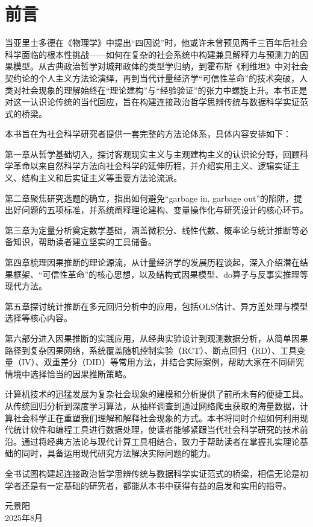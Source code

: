 \chapter*{前言}

当亚里士多德在《物理学》中提出``四因说''时，他或许未曾预见两千三百年后社会科学面临的根本性挑战——如何在复杂的社会系统中构建兼具解释力与预测力的因果模型。从古典政治哲学对城邦政体的类型学归纳，到霍布斯《利维坦》中对社会契约论的个人主义方法论演绎，再到当代计量经济学``可信性革命''的技术突破，人类对社会现象的理解始终在``理论建构''与``经验验证''的张力中螺旋上升。本书正是对这一认识论传统的当代回应，旨在构建连接政治哲学思辨传统与数据科学实证范式的桥梁。

本书旨在为社会科学研究者提供一套完整的方法论体系，具体内容安排如下：

\begin{itemize}
    {\fangsong \item 第一章从哲学基础切入，探讨客观现实主义与主观建构主义的认识论分野，回顾科学革命以来自然科学方法向社会科学的延伸历程，并介绍实用主义、逻辑实证主义、结构主义和后实证主义等重要方法论流派。
    
    \item 第二章聚焦研究选题的确立，指出如何避免``garbage in, garbage out''的陷阱，提出好问题的五项标准，并系统阐释理论建构、变量操作化与研究设计的核心环节。
    
    \item 第三章为定量分析奠定数学基础，涵盖微积分、线性代数、概率论与统计推断等必备知识，帮助读者建立坚实的工具储备。
    
    \item 第四章梳理因果推断的理论源流，从计量经济学的发展历程谈起，深入介绍潜在结果框架、``可信性革命''的核心思想，以及结构式因果模型、do算子与反事实推理等现代方法。
    
    \item 第五章探讨统计推断在多元回归分析中的应用，包括OLS估计、异方差处理与模型选择等核心内容。
    
    \item 第六部分进入因果推断的实践应用，从经典实验设计到观测数据分析，从简单因果路径到复杂因果网络，系统覆盖随机控制实验（RCT）、断点回归（RD）、工具变量（IV）、双重差分（DID）等常用方法，并结合实际案例，帮助大家在不同研究情境中选择恰当的因果推断策略。}
\end{itemize}

计算机技术的迅猛发展为复杂社会现象的建模和分析提供了前所未有的便捷工具。从传统回归分析到深度学习算法，从抽样调查到通过网络爬虫获取的海量数据，计算社会科学正在重塑我们理解和解释社会现象的方式。本书将同时介绍如何利用现代统计软件和编程工具进行数据处理，使读者能够紧跟当代社会科学研究的技术前沿。通过将经典方法论与现代计算工具相结合，致力于帮助读者在掌握扎实理论基础的同时，具备运用现代研究方法解决实际问题的能力。

全书试图构建起连接政治哲学思辨传统与数据科学实证范式的桥梁，相信无论是初学者还是有一定基础的研究者，都能从本书中获得有益的启发和实用的指导。

\begin{flushright}
元景阳 \\
2025年8月
\end{flushright}

\newpage